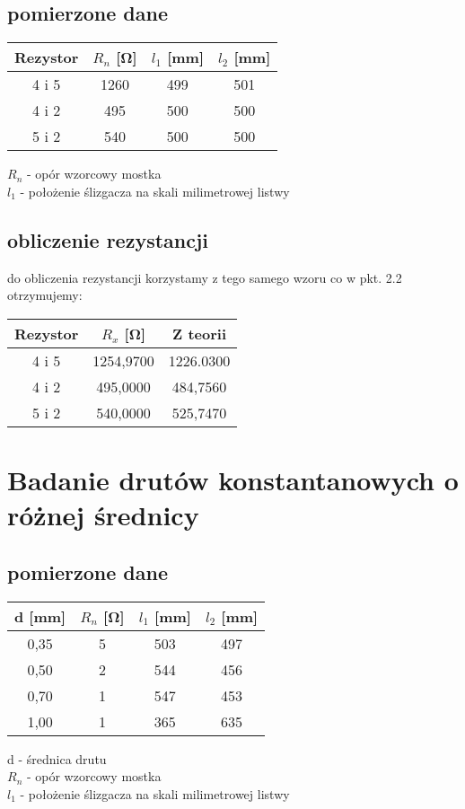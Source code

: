 \documentclass{article}
\begin{document}
\subsection{pomierzone dane}
\begin{center}
\begin{tabular}{ c |  c | c | c}
Rezystor & $R_n$ [\si{\ohm}] & $l_1$ [mm] & $l_2$ [mm]\\
\hline
 4 i 5 & 1260 & 499 & 501\\ 
 4 i 2 & 495 & 500 & 500\\ 
 5 i 2 & 540 & 500 & 500\\ 

\end{tabular}
\end{center}
$R_n$ - opór wzorcowy mostka\\ 
$l_1$ - położenie ślizgacza na skali milimetrowej listwy\\

\subsection{obliczenie rezystancji}
do obliczenia rezystancji korzystamy z tego samego wzoru co w pkt. 2.2\\
otrzymujemy: \\

\begin{center}
\begin{tabular}{ c | c | c}
Rezystor & $R_x$ [\si{\ohm}] & Z teorii\\
\hline
 4 i 5    & 1254,9700 &  1226.0300\\ 
 4 i 2    & 495,0000 & 484,7560\\ 
 5 i 2  & 540,0000 & 525,7470\\ 

 
\end{tabular}
\end{center}

\section{Badanie drutów konstantanowych o różnej średnicy}
\subsection{pomierzone dane}

\begin{center}
\begin{tabular}{ c |  c | c | c}
d [mm] & $R_n$ [\si{\ohm}] & $l_1$ [mm] & $l_2$ [mm]\\
\hline
 0,35 & 5 & 503 & 497\\ 
 0,50 & 2 & 544 & 456\\ 
 0,70 & 1 & 547 & 453\\ 
 1,00 & 1 & 365 & 635\\ 

\end{tabular}
\end{center}
{d} - średnica drutu\\
$R_n$ - opór wzorcowy mostka\\ 
$l_1$ - położenie ślizgacza na skali milimetrowej listwy\\
\end{document}
